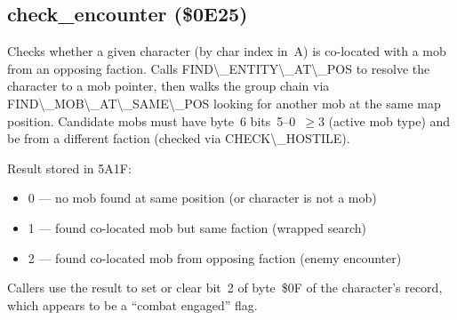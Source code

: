 \documentclass[10pt]{report}
\begin{document}
\nwendcode{}\nwdocspar

\subsection{check\_encounter (\$0E25)}

Checks whether a given character (by char index in~{\Tt{}A\nwendquote}) is co-located
with a mob from an opposing faction.  Calls {\Tt{}FIND{\textbackslash}{\_}ENTITY{\textbackslash}{\_}AT{\textbackslash}{\_}POS\nwendquote} to
resolve the character to a mob pointer, then walks the group chain via
{\Tt{}FIND{\textbackslash}{\_}MOB{\textbackslash}{\_}AT{\textbackslash}{\_}SAME{\textbackslash}{\_}POS\nwendquote} looking for another mob at the same map
position.  Candidate mobs must have byte~6 bits~5--0~$\ge3$ (active mob
type) and be from a different faction (checked via {\Tt{}CHECK{\textbackslash}{\_}HOSTILE\nwendquote}).

Result stored in {\Tt{}{\textbackslash}{\$}5A1F\nwendquote}:
\begin{itemize}
\item 0 --- no mob found at same position (or character is not a mob)
\item 1 --- found co-located mob but same faction (wrapped search)
\item 2 --- found co-located mob from opposing faction (enemy encounter)
\end{itemize}

Callers use the result to set or clear bit~2 of byte~\$0F of the
character's record, which appears to be a ``combat engaged'' flag.
\end{document}
